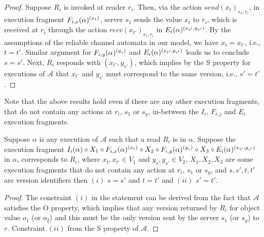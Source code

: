 \begin{proof}
Suppose $R_i$ is invoked at reader $r_i$.  Then, via the action $send(x_t)_{s_x, r_i}$, in 
execution fragment  $\frage{F_{i, x}}{\alpha}{x_{t}}$, server $s_1$ sends the value $x_t$ to $r_i$,   which is received at $r_i$ through the action 
$recv(x_{t'})_{s_1, r_i}$ in $\frage{E_i}{\alpha}{x_{t'}, y_{s'}}$.
 By the assumptions of the reliable channel automata in our model,  we have $x_{t}=x_{t'}$, i.e., $t=t'$. Similar argument for 
$\frage{F_{i,y}}{\alpha}{y_{s}}$  and $\frage{E_i}{\alpha}{x_{t'}, y_{s'}}$ leads us to conclude $s=s'$. Next, $R_i$ responds with $(x_{t'}, y_{s'})$, which implies  by the S property for executions of
 $\mathcal{A}$ that  $x_{t'}$ and $y_{s'}$ must correspond to the same version, i.e., $s'=t'$. %
\end{proof}


Note that the above results hold even if there are any other  execution fragments, that do not contain any actions at 
$r_i$, $s_1$ or $s_y$,   in-between the $I_i$, $F_{i, j}$ and $E_i$ execution  fragments. 
\begin{corollary}\label{lem:exec3_consistent_corollary} 
Suppose $\alpha$ is any execution of $\mathcal{A}$ such that a {\sc read} $R_i$ is in $\alpha$. Suppose the  execution 
fragment $\frage{I_i}{\alpha}{} \circ  X_1 \circ \frage{F_{i, x}}{\alpha}{x_{t}} \circ X_2 \circ  \frage{F_{i,y}}{\alpha}{y_{s}} \circ X_3 \circ \frage{E_i}{\alpha}{x_{t'}, y_{s'}}$ in $\alpha$,  corresponds to $R_i$,  where   $x_t, x_{t'} \in V_1$ and  $y_s, y_{s'} \in V_2$, $X_1, X_2, X_3$ are some execution fragments that do not contain any action at $r_i$, $s_1$ or $s_y$, and $s, s', t, t' $ are version identifiers  then $(i)$ $s = s'$  and $ t=t'$ and $(ii)$ $s'=t'$.  
\end{corollary}


\begin{proof} 
The constraint $(i)$ in the statement can be derived  from the fact that $\mathcal{A}$ satisfies the  O property,  which implies that any version returned by $R_i$ for object value $o_1$ (or $o_2$) and this  must be the only version sent by the server $s_1$ (or $s_y$) to $r$. Constraint 
$(ii)$ from the S property of $\mathcal{A}$.
\end{proof}



